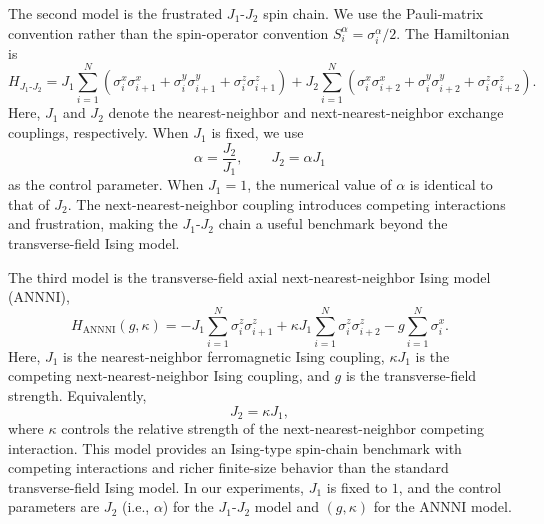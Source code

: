 \documentclass[pdflatex,sn-mathphys-num]{sn-jnl}%
\theoremstyle{thmstyleone}%
\theoremstyle{thmstyletwo}%
\theoremstyle{thmstylethree}%
\begin{document}
The second model is the frustrated \(J_1\)-\(J_2\) spin chain. We use the Pauli-matrix convention rather than the spin-operator convention \(S_i^\alpha=\sigma_i^\alpha/2\). The Hamiltonian is
\begin{equation}
H_{J_1\text{-}J_2}
=
J_1\sum_{i=1}^{N}
\left(
\sigma_i^x\sigma_{i+1}^x+
\sigma_i^y\sigma_{i+1}^y+
\sigma_i^z\sigma_{i+1}^z
\right)
+
J_2\sum_{i=1}^{N}
\left(
\sigma_i^x\sigma_{i+2}^x+
\sigma_i^y\sigma_{i+2}^y+
\sigma_i^z\sigma_{i+2}^z
\right).
\label{eq:j1j2_hamiltonian}
\end{equation}
Here, \(J_1\) and \(J_2\) denote the nearest-neighbor and next-nearest-neighbor exchange couplings, respectively. When \(J_1\) is fixed, we use
\begin{equation}
\alpha = \frac{J_2}{J_1},
\qquad
J_2 = \alpha J_1
\label{eq:j1j2_alpha}
\end{equation}
as the control parameter. When \(J_1=1\), the numerical value of \(\alpha\) is identical to that of \(J_2\). The next-nearest-neighbor coupling introduces competing interactions and frustration, making the \(J_1\)-\(J_2\) chain a useful benchmark beyond the transverse-field Ising model.

The third model is the transverse-field axial next-nearest-neighbor Ising model (ANNNI),
\begin{equation}
H_{\mathrm{ANNNI}}(g,\kappa)
=
-J_1\sum_{i=1}^{N}\sigma_i^z\sigma_{i+1}^z
+
\kappa J_1\sum_{i=1}^{N}\sigma_i^z\sigma_{i+2}^z
-
g\sum_{i=1}^{N}\sigma_i^x .
\label{eq:annni_hamiltonian}
\end{equation}
Here, \(J_1\) is the nearest-neighbor ferromagnetic Ising coupling, \(\kappa J_1\) is the competing next-nearest-neighbor Ising coupling, and \(g\) is the transverse-field strength. Equivalently,
\begin{equation}
J_2 = \kappa J_1 ,
\label{eq:annni_kappa}
\end{equation}
where \(\kappa\) controls the relative strength of the next-nearest-neighbor competing interaction. 
This model provides an Ising-type spin-chain benchmark with competing interactions and richer finite-size behavior than the standard transverse-field Ising model.
In our experiments, \(J_1\) is fixed to \(1\), and the control parameters are \(J_2\) (i.e., \(\alpha\)) for the \(J_1\)-\(J_2\) model and \((g,\kappa)\) for the ANNNI model.
\end{document}
